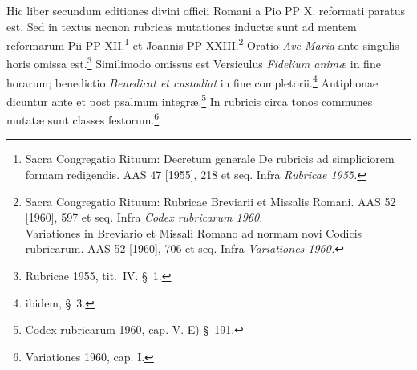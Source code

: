 
Hic liber secundum editiones divini officii Romani 
a Pio PP X. reformati paratus est.
Sed in textus necnon rubricas mutationes inductæ sunt ad mentem
reformarum
Pii PP XII.\footnote{Sacra Congregatio Rituum:
  Decretum generale
  De rubricis ad simpliciorem formam redigendis.
  AAS 47 [1955], 218 et seq.
  Infra \textit{Rubricae 1955.}} 
et Joannis PP XXIII.\footnote{Sacra Congregatio Rituum:
  Rubricae Breviarii et Missalis Romani.
  AAS 52 [1960], 597 et seq.
  Infra \textit{Codex rubricarum 1960.}\\
  Variationes in Breviario et Missali Romano ad normam novi Codicis rubricarum.
  AAS 52 [1960], 706 et seq. 
  Infra \textit{Variationes 1960.}}
%
Oratio \textit{Ave Maria} ante singulis horis omissa est.\footnote{Rubricae 1955, tit.~IV. §~1.}
%
Similimodo omissus est Versiculus \textit{Fidelium animæ} in fine horarum;
benedictio \textit{Benedicat et custodiat} in fine completorii.\footnote{ibidem, §~3.}
%
Antiphonae dicuntur ante et post psalmum integræ.\footnote{Codex rubricarum 1960, cap. V. E) §~191.}
%
In rubricis circa tonos communes mutatæ sunt classes festorum.\footnote{Variationes 1960, cap. I.}



